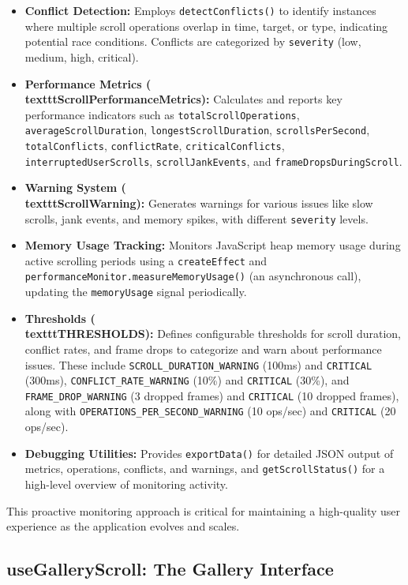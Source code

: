 \documentclass[10pt]{article}
\begin{document}
\begin{itemize}
    \item \textbf{Conflict Detection:} Employs \texttt{detectConflicts()} to identify instances where multiple scroll operations overlap in time, target, or type, indicating potential race conditions. Conflicts are categorized by \texttt{severity} (low, medium, high, critical).
    \item \textbf{Performance Metrics (\\texttt{ScrollPerformanceMetrics}):} Calculates and reports key performance indicators such as \texttt{totalScrollOperations}, \texttt{averageScrollDuration}, \texttt{longestScrollDuration}, \texttt{scrollsPerSecond}, \texttt{totalConflicts}, \texttt{conflictRate}, \texttt{criticalConflicts}, \texttt{interruptedUserScrolls}, \texttt{scrollJankEvents}, and \texttt{frameDropsDuringScroll}.
    \item \textbf{Warning System (\\texttt{ScrollWarning}):} Generates warnings for various issues like slow scrolls, jank events, and memory spikes, with different \texttt{severity} levels.
    \item \textbf{Memory Usage Tracking:} Monitors JavaScript heap memory usage during active scrolling periods using a \texttt{createEffect} and \texttt{performanceMonitor.measureMemoryUsage()} (an asynchronous call), updating the \texttt{memoryUsage} signal periodically.
    \item \textbf{Thresholds (\\texttt{THRESHOLDS}):} Defines configurable thresholds for scroll duration, conflict rates, and frame drops to categorize and warn about performance issues. These include \texttt{SCROLL\_DURATION\_WARNING} (100ms) and \texttt{CRITICAL} (300ms), \texttt{CONFLICT\_RATE\_WARNING} (10\%) and \texttt{CRITICAL} (30\%), and \texttt{FRAME\_DROP\_WARNING} (3 dropped frames) and \texttt{CRITICAL} (10 dropped frames), along with \texttt{OPERATIONS\_PER\_SECOND\_WARNING} (10 ops/sec) and \texttt{CRITICAL} (20 ops/sec).
    \item \textbf{Debugging Utilities:} Provides \texttt{exportData()} for detailed JSON output of metrics, operations, conflicts, and warnings, and \texttt{getScrollStatus()} for a high-level overview of monitoring activity.
\end{itemize}
This proactive monitoring approach is critical for maintaining a high-quality user experience as the application evolves and scales.

\subsection{useGalleryScroll: The Gallery Interface}
\end{document}
